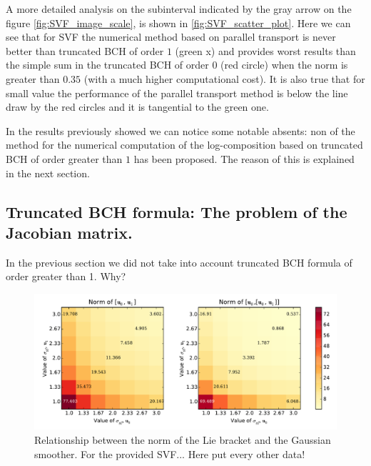 A more detailed analysis on the subinterval indicated by the gray arrow on the figure \ref{fig:SVF_image_scale}, is shown in \ref{fig:SVF_scatter_plot}.
Here we can see that for SVF the numerical method based on parallel transport is never better than  truncated BCH of order $1$ (green x) and provides worst results than the simple sum in the truncated BCH of order $0$ (red circle) when the norm is greater than $0.35$ (with a much higher computational cost). It is also true that for small value the performance of the parallel transport method is below the line draw by the red circles and it is tangential to the green one.

In the results previously showed we can notice some notable absents: non of the method for the numerical computation of the log-composition based on truncated BCH of order greater than $1$ has been proposed. The reason of this is explained in the next section.


\subsection{Truncated BCH formula: The problem of the Jacobian matrix.}

In the previous section we did not take into account truncated BCH formula of order greater than 1. Why?










\begin{figure}[!ht]
	\hspace{0cm}
	\includegraphics[scale=0.5]{figures/SVF_image_scale_bracket_versus_gaussian.pdf}
	\caption{Relationship between the norm of the Lie bracket and the Gaussian smoother. For the provided SVF... Here put every other data!}
	\label{fig:SVF_image_scale_bracket_versus_gaussian}
\end{figure}



